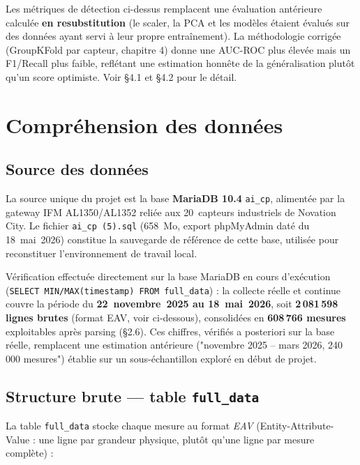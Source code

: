 \documentclass[12pt,a4paper]{report}
\begin{document}
\begin{correctionbox}
Les métriques de détection ci-dessus remplacent une évaluation antérieure calculée
\textbf{en resubstitution} (le scaler, la PCA et les modèles étaient évalués sur des
données ayant servi à leur propre entraînement). La méthodologie corrigée
(GroupKFold par capteur, chapitre 4) donne une AUC-ROC plus élevée mais un F1/Recall
plus faible, reflétant une estimation honnête de la généralisation plutôt qu'un score
optimiste. Voir §4.1 et §4.2 pour le détail.
\end{correctionbox}

\section{Compréhension des données}

\subsection{Source des données}

La source unique du projet est la base \textbf{MariaDB 10.4} \texttt{ai\_cp}, alimentée par
la gateway IFM AL1350/AL1352 reliée aux 20~capteurs industriels de Novation City. Le fichier
\texttt{ai\_cp~(5).sql} (658~Mo, export phpMyAdmin daté du 18~mai~2026) constitue la sauvegarde
de référence de cette base, utilisée pour reconstituer l'environnement de travail local.

\begin{correctionbox}
Vérification effectuée directement sur la base MariaDB en cours d'exécution
(\texttt{SELECT MIN/MAX(timestamp) FROM full\_data}) : la collecte réelle et continue couvre
la période du \textbf{22~novembre~2025 au 18~mai~2026}, soit \textbf{2\,081\,598 lignes brutes}
(format EAV, voir ci-dessous), consolidées en \textbf{608\,766 mesures} exploitables après
parsing (§2.6). Ces chiffres, vérifiés a posteriori sur la base réelle, remplacent une
estimation antérieure ("novembre 2025 -- mars 2026, 240\,000 mesures") établie sur un
sous-échantillon exploré en début de projet.
\end{correctionbox}

\subsection{Structure brute --- table \texttt{full\_data}}

La table \texttt{full\_data} stocke chaque mesure au format \emph{EAV} (Entity-Attribute-Value :
une ligne par grandeur physique, plutôt qu'une ligne par mesure complète) :
\end{document}
